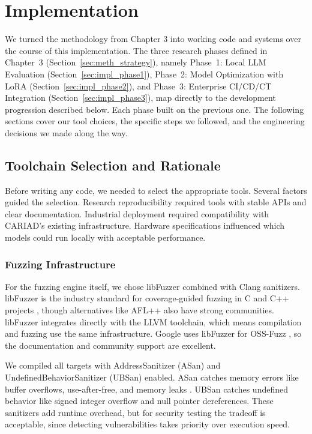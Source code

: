 
\chapter{Implementation}
\label{chap:implementation}

We turned the methodology from Chapter 3 into working code and systems over the course of this implementation. The three research phases defined in Chapter~3 (Section~\ref{sec:meth_strategy}), namely Phase~1: Local LLM Evaluation (Section~\ref{sec:impl_phase1}), Phase~2: Model Optimization with LoRA (Section~\ref{sec:impl_phase2}), and Phase~3: Enterprise CI/CD/CT Integration (Section~\ref{sec:impl_phase3}), map directly to the development progression described below. Each phase built on the previous one. The following sections cover our tool choices, the specific steps we followed, and the engineering decisions we made along the way.

\section{Toolchain Selection and Rationale}
\label{sec:impl_toolchain}

Before writing any code, we needed to select the appropriate tools. Several factors guided the selection. Research reproducibility required tools with stable APIs and clear documentation. Industrial deployment required compatibility with CARIAD's existing infrastructure. Hardware specifications influenced which models could run locally with acceptable performance.

\subsection{Fuzzing Infrastructure}

For the fuzzing engine itself, we chose libFuzzer combined with Clang sanitizers. libFuzzer is the industry standard for coverage-guided fuzzing in C and C++ projects \cite{LibFuzzer2015}, though alternatives like AFL++ \cite{AFLPlusPlus} also have strong communities. libFuzzer integrates directly with the LLVM toolchain, which means compilation and fuzzing use the same infrastructure. Google uses libFuzzer for OSS-Fuzz \cite{OSSFuzzBugs2021}, so the documentation and community support are excellent.

We compiled all targets with AddressSanitizer (ASan) and UndefinedBehaviorSanitizer (UBSan) enabled. ASan catches memory errors like buffer overflows, use-after-free, and memory leaks \cite{LibFuzzer2015}. UBSan catches undefined behavior like signed integer overflow and null pointer dereferences. These sanitizers add runtime overhead, but for security testing the tradeoff is acceptable, since detecting vulnerabilities takes priority over execution speed.

